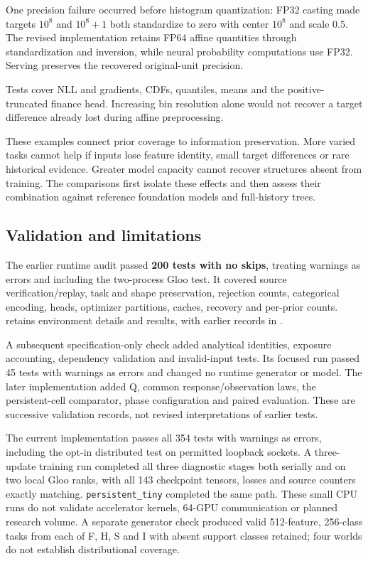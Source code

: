 \documentclass[11pt]{article}
\begin{document}
One precision failure occurred before histogram quantization: FP32 casting made targets $10^8$ and $10^8+1$ both standardize to zero with center $10^8$ and scale $0.5$. The revised implementation retains FP64 affine quantities through standardization and inversion, while neural probability computations use FP32. Serving preserves the recovered original-unit precision.

Tests cover NLL and gradients, CDFs, quantiles, means and the positive-truncated finance head. Increasing bin resolution alone would not recover a target difference already lost during affine preprocessing.

These examples connect prior coverage to information preservation. More varied tasks cannot help if inputs lose feature identity, small target differences or rare historical evidence. Greater model capacity cannot recover structures absent from training. The comparisons first isolate these effects and then assess their combination against reference foundation models and full-history trees.

\subsection{Validation and limitations}

The earlier runtime audit passed \textbf{200 tests with no skips}, treating warnings as errors and including the two-process Gloo test. It covered source verification/replay, task and shape preservation, rejection counts, categorical encoding, heads, optimizer partitions, caches, recovery and per-prior counts.  retains environment details and results, with earlier records in .

A subsequent specification-only check added analytical identities, exposure accounting, dependency validation and invalid-input tests. Its focused run passed 45 tests with warnings as errors and changed no runtime generator or model. The later implementation added Q, common response/observation laws, the persistent-cell comparator, phase configuration and paired evaluation. These are successive validation records, not revised interpretations of earlier tests.

The current implementation passes all 354 tests with warnings as errors, including the opt-in distributed test on permitted loopback sockets. A three-update training run completed all three diagnostic stages both serially and on two local Gloo ranks, with all 143 checkpoint tensors, losses and source counters exactly matching. \texttt{persistent\_tiny} completed the same path. These small CPU runs do not validate accelerator kernels, 64-GPU communication or planned research volume. A separate generator check produced valid 512-feature, 256-class tasks from each of F, H, S and I with absent support classes retained; four worlds do not establish distributional coverage.
\end{document}

